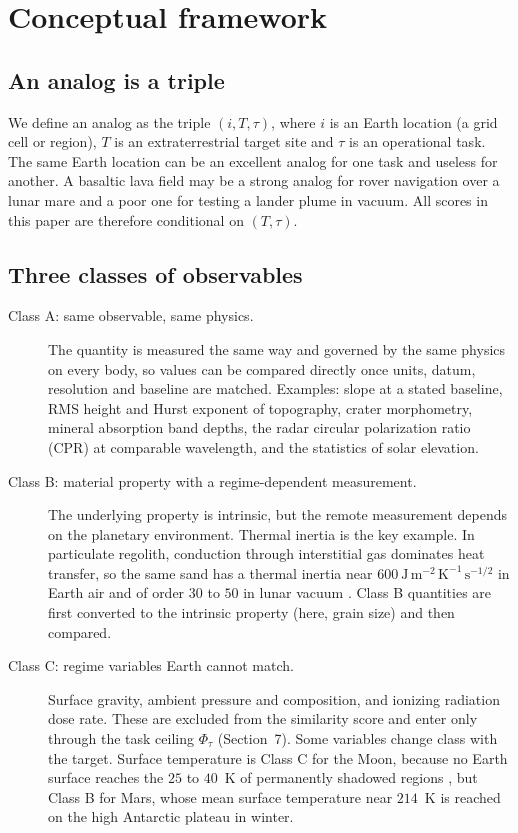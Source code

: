 \documentclass[11pt,a4paper]{article}
\begin{document}
\section{Conceptual framework}

\subsection{An analog is a triple}
We define an analog as the triple $(i, T, \tau)$, where $i$ is an Earth location (a grid cell or region), $T$ is an extraterrestrial target site and $\tau$ is an operational task. The same Earth location can be an excellent analog for one task and useless for another. A basaltic lava field may be a strong analog for rover navigation over a lunar mare and a poor one for testing a lander plume in vacuum. All scores in this paper are therefore conditional on $(T,\tau)$.

\subsection{Three classes of observables}
\begin{description}
\item[Class A: same observable, same physics.] The quantity is measured the same way and governed by the same physics on every body, so values can be compared directly once units, datum, resolution and baseline are matched. Examples: slope at a stated baseline, RMS height and Hurst exponent of topography, crater morphometry, mineral absorption band depths, the radar circular polarization ratio (CPR) at comparable wavelength, and the statistics of solar elevation.
\item[Class B: material property with a regime-dependent measurement.] The underlying property is intrinsic, but the remote measurement depends on the planetary environment. Thermal inertia is the key example. In particulate regolith, conduction through interstitial gas dominates heat transfer, so the same sand has a thermal inertia near $600~\mathrm{J\,m^{-2}\,K^{-1}\,s^{-1/2}}$ in Earth air and of order $30$ to $50$ in lunar vacuum \citep{presley1997,hayne2017}. Class B quantities are first converted to the intrinsic property (here, grain size) and then compared.
\item[Class C: regime variables Earth cannot match.] Surface gravity, ambient pressure and composition, and ionizing radiation dose rate. These are excluded from the similarity score and enter only through the task ceiling $\Phi_\tau$ (Section~7). Some variables change class with the target. Surface temperature is Class C for the Moon, because no Earth surface reaches the $25$ to $40$~K of permanently shadowed regions \citep{paige2010}, but Class B for Mars, whose mean surface temperature near $214$~K is reached on the high Antarctic plateau in winter.
\end{description}
\end{document}
